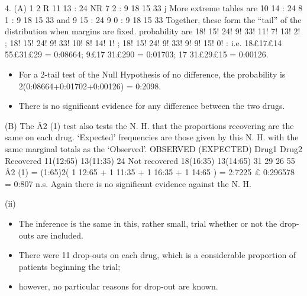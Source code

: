 \documentclass[a4paper,12pt]{article}
\begin{document}
4. (A)
1 2
R 11 13 : 24
NR 7 2 : 9
18 15 33
j
More extreme tables are
10 14 : 24
8 1 : 9
18 15 33
and 9 15 : 24
9 0 : 9
18 15 33
Together, these form the “tail” of the distribution when margins are fixed.
probability are
18! 15! 24! 9!
33! 11! 7! 13! 2!
;
18! 15! 24! 9!
33! 10! 8! 14! 1!
;
18! 15! 24! 9!
33! 9! 9! 15! 0! :
i.e. 18£17£14
55£31£29 = 0:08664; 9£17
31£290 = 0:01703; 17
31£29£15 = 0:00126.
\begin{itemize}
    \item For a 2-tail test of the Null Hypothesis of no difference, the probability is
2(0:08664+0:01702+0:00126) = 0:2098. 
\item There is no significant evidence for
any difference between the two drugs.

\end{itemize}

(B) The Â2
(1) test also tests the N. H. that the proportions recovering are the
same on each drug. ‘Expected’ frequencies are those given by this N. H. with
the same marginal totals as the ‘Observed’.
OBSERVED (EXPECTED) Drug1 Drug2
Recovered 11(12:65) 13(11:35) 24
Not recovered 18(16:35) 13(14:65) 31
29 26 55
Â2
(1) = (1:65)2( 1
12:65 + 1
11:35 + 1
16:35 + 1
14:65 ) = 2:7225 £ 0:296578 = 0:807 n.s.
Again there is no significant evidence against the N. H.


(ii) 
\begin{itemize}
\item The inference is the same in this, rather small, trial whether or not the
drop-outs are included. 
\item There were 11 drop-outs on each drug, which is a
considerable proportion of patients beginning the trial; 
\item however, no particular
reasons for drop-out are known.
\end{itemize}
\end{document}
